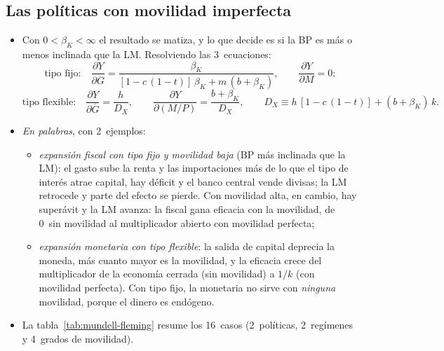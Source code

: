 \documentclass[11pt]{article}
\begin{document}
\subsection{Las políticas con movilidad imperfecta}\label{anexo:is-lm-bp-imperfecta}

\begin{itemize}
\item Con $0<\beta_K<\infty$ el resultado se matiza, y lo que decide es si la BP es más o menos inclinada que la LM. Resolviendo las 3~ecuaciones\nocite{Heijdra2017Foundations}:
  \begin{equation}\label{eq:anexo-multiplicadores-fijo}
  \text{tipo fijo:}\quad \frac{\partial Y}{\partial\overline{G}}=\frac{\beta_K}{[1-c\,(1-t)]\,\beta_K+m\,(b+\beta_K)},\qquad \frac{\partial Y}{\partial M}=0;
  \end{equation}
  \begin{equation}\label{eq:anexo-multiplicadores-flexible}
  \text{tipo flexible:}\quad \frac{\partial Y}{\partial\overline{G}}=\frac{h}{D_X},\qquad \frac{\partial Y}{\partial(M/P)}=\frac{b+\beta_K}{D_X},\qquad D_X\equiv h\,[1-c\,(1-t)]+(b+\beta_K)\,k.
  \end{equation}
\item \emph{En palabras}, con 2~ejemplos:
  \begin{itemize}
  \item \emph{expansión fiscal con tipo fijo y movilidad baja} (BP más inclinada que la LM): el gasto sube la renta y las importaciones más de lo que el tipo de interés atrae capital, hay déficit y el banco central vende divisas; la LM retrocede y parte del efecto se pierde. Con movilidad alta, en cambio, hay superávit y la LM avanza: la fiscal gana eficacia con la movilidad, de 0~sin movilidad al multiplicador abierto con movilidad perfecta;
  \item \emph{expansión monetaria con tipo flexible}: la salida de capital deprecia la moneda, más cuanto mayor es la movilidad, y la eficacia crece del multiplicador de la economía cerrada (sin movilidad) a $1/k$ (con movilidad perfecta). Con tipo fijo, la monetaria no sirve con \emph{ninguna} movilidad, porque el dinero es endógeno.
  \end{itemize}
\item La tabla~\ref{tab:mundell-fleming} resume los 16~casos (2~políticas, 2~regímenes y 4~grados de movilidad).
\end{itemize}
\end{document}
